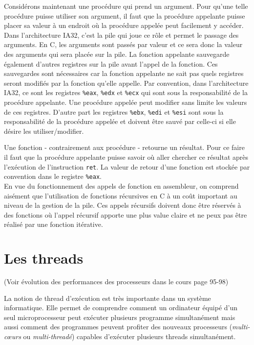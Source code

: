Considérons maintenant une procédure qui prend un argument.
Pour qu'une telle procédure puisse utiliser son argument,
il faut que la procédure appelante puisse placer sa valeur à un endroit où la procédure appelée peut facilement y accéder.
Dans l'architecture IA32, c'est la pile qui joue ce rôle et permet le passage des arguments.
En C, les arguments sont passés par valeur et ce sera donc la valeur des arguments qui sera placée sur la pile.
La fonction appelante sauvegarde également d'autres registres sur la pile avant l'appel de la fonction.
Ces sauvegardes sont nécessaires car la fonction appelante ne sait pas quels registres seront modifiés par la fonction qu'elle appelle.
Par convention, dans l'architecture IA32, ce sont les registres \texttt{\%eax}, \texttt{\%edx} et \texttt{\%ecx} qui sont sous la responsabilité de la procédure appelante.
Une procédure appelée peut modifier sans limite les valeurs de ces registres.
D'autre part les registres \texttt{\%ebx}, \texttt{\%edi} et \texttt{\%esi} sont sous la responsabilité de la procédure appelée et doivent être sauvé par celle-ci si elle désire les utiliser/modifier.


Une fonction - contrairement aux procédure - retourne un résultat.
Pour ce faire il faut que la procédure appelante puisse savoir où aller
chercher ce résultat après l'exécution de l'instruction \texttt{ret}.
La valeur de retour d'une fonction est stockée par convention
dans le registre \texttt{\%eax}.\\

En vue du fonctionnement des appels de fonction en assembleur, on comprend aisément que l'utilisation de fonctions récursives en C à un coût important au niveau de la gestion de la pile.
Ces appels récursifs doivent donc être réservés à des fonctions où l'appel récursif apporte une plus value claire et ne peux pas être réalisé par une fonction itérative.

\section{Les threads}
(Voir évolution des performances des processeurs dans le cours page 95-98)

La notion de thread d'exécution est très importante
dans un système informatique.
Elle permet de comprendre comment un ordinateur équipé d'un seul microprocesseur peut exécuter plusieurs programme simultanément mais aussi comment des programmes peuvent profiter des nouveaux processeurs (\emph{multi-cœurs} ou \emph{multi-threadé}) capables d'exécuter plusieurs threads simultanément.

